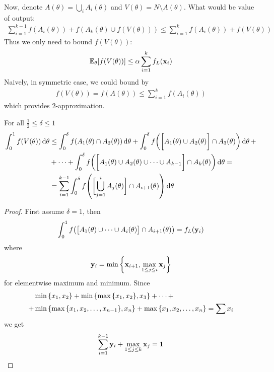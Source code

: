 Now, denote $A(\theta) = \bigcup_i A_i(\theta)$ and $V(\theta) = N \setminus A(\theta)$. What would be value of output:
\begin{align}
\sum_{i=1}^{k-1} f(A_i(\theta)) + f(A_k(\theta) \cup f(V(\theta))) \leq \sum_{i=1}^k f(A_i(\theta)) + f(V(\theta))
\end{align}
Thus we only need to bound $f(V(\theta))$:
\begin{align}
\mathbb{E}_\theta [f(V(\theta))] \leq \alpha \sum_{i=1}^{k} f_L(\vb{x}_i) 
\end{align}
Naively, in symmetric case, we could bound by
\begin{align}
f(V(\theta)) = f(A(\theta)) \leq \sum_{i=1}^{k} f(A_i(\theta))  
\end{align}
which provides $2$-approximation.
\begin{lemma}\label{th:delta_lemma}
	For all $\frac{1}{2} \leq \delta \leq 1$
	\begin{align}
	\int_0^1 f(V(\theta)) \dd{\theta} &\leq \int_0^\delta f(A_1(\theta) \cap A_2(\theta)) \dd{\theta} + \int_0^\delta f\qty(\qty\bigg[A_1(\theta) \cup A_2(\theta)] \cap A_3(\theta)) \dd{\theta} +\\&+ \dots + \int_0^\delta f\qty(\qty\bigg[A_1(\theta) \cup A_2(\theta) \cup \dots \cup A_{k-1}] \cap A_k(\theta)) \dd{\theta} =\\&= \sum_{i=1}^{k-1} \int_0^\delta f\qty(\qty\bigg[ \bigcup_{j=1}^{i} A_j(\theta)] \cap A_{i+1}(\theta)) \dd{\theta} 
	\end{align}
	\begin{proof}
		First assume $\delta=1$, then
		\begin{align}
		\int_0^1 f\qty(\qty\big[A_1(\theta) \cup \dots \cup A_{i}(\theta)] \cap A_{i+1}(\theta)) = f_L(\vb{y}_i)
		\end{align}
		where
		\begin{align}
		\vb{y}_i = \min \qty{\vb{x}_{i+1},\max\limits_{1\leq j \leq i} \vb{x}_j  }
		\end{align}
		for elementwise maximum and minimum. Since
		\begin{align}
		&\min\qty{x_1, x_2} + \min\qty{\max\qty{x_1, x_2} , x_3} +\dots +\\+& \min\qty{\max\qty{x_1, x_2, \dots, x_{n-1}} , x_n} +\max\qty{x_1, x_2, \dots, x_{n}} = \sum x_i
		\end{align}
		we get
		\begin{align}
		\sum_{i=1}^{k-1} \vb{y}_i + \max\limits_{1\leq j \leq k} \vb{x}_j  = \vb{1}
		\end{align}
		

\end{proof}
\end{lemma}

